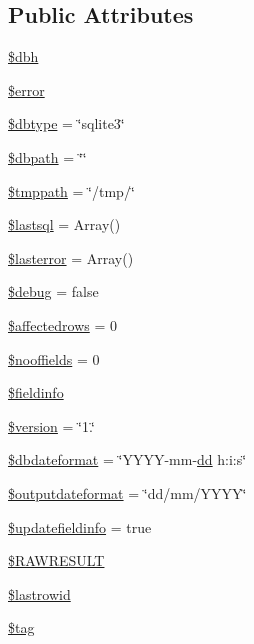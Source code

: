 \subsection*{Public Attributes}
\begin{DoxyCompactItemize}
\item 
\hyperlink{classDebby_aa4930493a32523bb82bf4491e6e48f01}{\$dbh}
\item 
\hyperlink{classDebby_a0ac5d819d971fa898a2e88dc5991b008}{\$error}
\item 
\hyperlink{classDebby_a4697ceb97e707ab80ae2a215f932b58d}{\$dbtype} = \char`\"{}sqlite3\char`\"{}
\item 
\hyperlink{classDebby_a95c130458f29f6c7c240cdc93a071085}{\$dbpath} = \char`\"{}\char`\"{}
\item 
\hyperlink{classDebby_afffc183cbae8307150a838bf3a053ca8}{\$tmppath} = \char`\"{}/tmp/\char`\"{}
\item 
\hyperlink{classDebby_ae609a3e9058918214dbac27c36381323}{\$lastsql} = Array()
\item 
\hyperlink{classDebby_ab74aec371d05b763d7c8123b80621c3d}{\$lasterror} = Array()
\item 
\hyperlink{classDebby_a7ff78fa74f4b5822202b30a254600012}{\$debug} = false
\item 
\hyperlink{classDebby_ab409e48612acfcba8cf89743b45b4457}{\$affectedrows} = 0
\item 
\hyperlink{classDebby_a72634c1e21e0f68c5a69e6a1db478ff5}{\$nooffields} = 0
\item 
\hyperlink{classDebby_a7d54dc610647753b09fd501ee0b65f54}{\$fieldinfo}
\item 
\hyperlink{classDebby_a378b706b515617c9019b313136e4678c}{\$version} = \char`\"{}1.\char`\"{}
\item 
\hyperlink{classDebby_a2f7e21b7f33e7ad7ea66a5f55ad7876a}{\$dbdateformat} = \char`\"{}Y\+Y\+Y\+Y-\/mm-\/\hyperlink{Shape_8php_ab8bded9253c481cadc72d4df086e52b7}{dd} h\+:i\+:s\char`\"{}
\item 
\hyperlink{classDebby_a708fea658eab39aad196703f8b8aaa18}{\$outputdateformat} = \char`\"{}dd/mm/Y\+Y\+Y\+Y\char`\"{}
\item 
\hyperlink{classDebby_a3e7f1fb2178543ff80e0ce7e7b85e528}{\$updatefieldinfo} = true
\item 
\hyperlink{classDebby_a462ad03fefee05b5f763469f8bb5abfc}{\$\+R\+A\+W\+R\+E\+S\+U\+L\+T}
\item 
\hyperlink{classDebby_af86fbd6343eccc180f84e816627a5a91}{\$lastrowid}
\item 
\hyperlink{classDebby_aaa503bfd657eddafff230f0d49da7cb1}{\$tag}
\end{DoxyCompactItemize}


